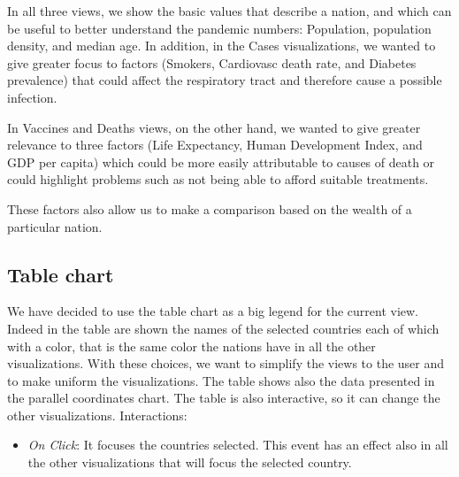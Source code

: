 \documentclass[10pt,conference]{IEEEtran}
\begin{document}
In all three views, we show the basic values that describe a nation, and which can be useful to better understand the pandemic numbers: Population, population density, and median age. In addition, in the Cases visualizations, we wanted to give greater focus to factors (Smokers, Cardiovasc death rate, and Diabetes prevalence) that could affect the respiratory tract and therefore cause a possible infection.

In Vaccines and Deaths views, on the other hand, we wanted to give greater relevance to three factors (Life Expectancy, Human Development Index, and GDP per capita) which could be more easily attributable to causes of death or could highlight problems such as not being able to afford suitable treatments.

These factors also allow us to make a comparison based on the wealth of a particular nation.

\begin{figure}
\end{figure}


\subsection{Table chart}
We have decided to use the table chart as a big legend for the current view. Indeed in the table are shown the names of the selected countries each of which with a color, that is the same color the nations have in all the other visualizations. With these choices, we want to simplify the views to the user and to make uniform the visualizations.
The table shows also the data presented in the parallel coordinates chart. The table is also interactive, so it can change the other visualizations.
Interactions:
\begin{itemize}
 \item {\em On Click}: It focuses the countries selected. This event has an effect also in all the other visualizations that will focus the selected country.
\end{itemize}
\end{document}
